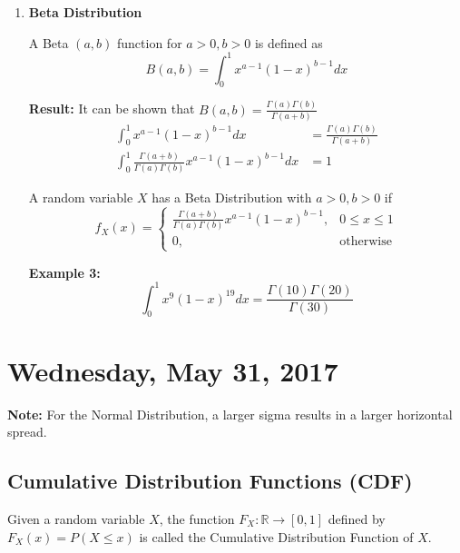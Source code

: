 \documentclass[12pt]{article}
\begin{document}
\begin{enumerate}
{	}
	\item{
	\textbf{Beta Distribution}\\
	\begin{tcolorbox}[title=Definition: Beta Function]
		A Beta $(a,b)$ function for $a > 0, b > 0$ is defined as
		$$B(a,b) = \int^1_0 x^{a - 1} (1-x)^{b-1} dx$$
	\end{tcolorbox}

	\textbf{Result:} It can be shown that $B(a,b) = \frac{\Gamma (a) \Gamma (b)}{\Gamma (a+b)}$
	\begin{align*}
		\int^1_0 x^{a - 1} (1-x)^{b-1} dx &= \frac{\Gamma (a) \Gamma (b)}{\Gamma (a+b)}\\
		\int^1_0 \frac{\Gamma (a+b)}{\Gamma (a) \Gamma (b)} x^{a - 1} (1-x)^{b-1} dx &= 1
	\end{align*}

	\begin{tcolorbox}[title=Beta Distribution]
		A random variable $X$ has a Beta Distribution with $a > 0, b > 0$ if
		$$f_X (x) = \begin{cases}
		\frac{\Gamma (a+b)}{\Gamma (a) \Gamma (b)} x^{a - 1} (1-x)^{b-1}, & 0 \leq x \leq 1\\
		0, & \text{otherwise}
		\end{cases}
		$$
	\end{tcolorbox}

	\textbf{Example 3:} $$\int^1_0 x^9 (1-x)^{19} dx = \frac{\Gamma (10)\Gamma (20)}{\Gamma (30)}$$

	}
\end{enumerate}

\newpage

\section{Wednesday, May 31, 2017}

\textbf{Note:} For the Normal Distribution, a larger sigma results in a larger horizontal spread.

\subsection{Cumulative Distribution Functions (CDF)}

\begin{tcolorbox}[title=Definition: Cumulative Distribution Functions]
	Given a random variable $X$, the function $F_X : \mathbb{R} \longrightarrow [0,1]$ defined by $F_X (x) = P(X \leq x)$ is called the Cumulative Distribution Function of $X$.
\end{tcolorbox}
\end{document}
